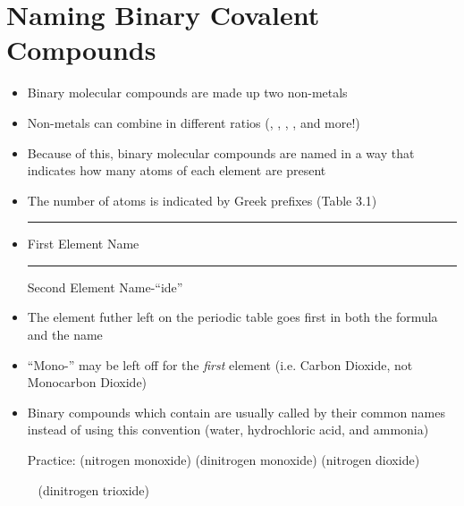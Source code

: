 \documentclass[12pt, openany, letterpaper]{memoir}
\begin{document}
\section{Naming Binary Covalent Compounds}
\begin{itemize}
	\item Binary molecular compounds are made up two non-metals
	\item Non-metals can combine in different ratios (, , , , and more!)
	\item Because of this, binary molecular compounds are named in a way that indicates how many atoms of each element are present
	\item The number of atoms is indicated by Greek prefixes (Table 3.1)
	\item \rule[-1mm]{1in}{.1pt} First Element Name \rule[-1mm]{1in}{.1pt} Second Element Name-``ide''
	\item The element futher left on the periodic table goes first in both the formula and the name
	\item ``Mono-'' may be left off for the \emph{first} element (i.e. Carbon Dioxide, not Monocarbon Dioxide)
	\item Binary compounds which contain  are usually called by their common names instead of using this convention (water, hydrochloric acid, and ammonia)

	      Practice:  (nitrogen monoxide)  \hspace{1em}  (dinitrogen monoxide)  \hspace{1em}  (nitrogen dioxide)

	      ~\hphantom{Practice:}  (dinitrogen trioxide)
\end{itemize}
\end{document}
